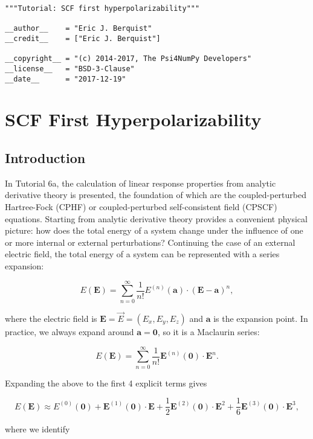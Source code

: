 \documentclass[]{article}
\date{}
\begin{document}
\begin{verbatim}
"""Tutorial: SCF first hyperpolarizability"""

__author__    = "Eric J. Berquist"
__credit__    = ["Eric J. Berquist"]

__copyright__ = "(c) 2014-2017, The Psi4NumPy Developers"
__license__   = "BSD-3-Clause"
__date__      = "2017-12-19"
\end{verbatim}

\hypertarget{scf-first-hyperpolarizability}{%
\section{SCF First
Hyperpolarizability}\label{scf-first-hyperpolarizability}}

\hypertarget{introduction}{%
\subsection{Introduction}\label{introduction}}

In Tutorial 6a, the calculation of linear response properties from
analytic derivative theory is presented, the foundation of which are the
coupled-perturbed Hartree-Fock (CPHF) or coupled-perturbed
self-consistent field (CPSCF) equations. Starting from analytic
derivative theory provides a convenient physical picture: how does the
total energy of a system change under the influence of one or more
internal or external perturbations? Continuing the case of an external
electric field, the total energy of a system can be represented with a
series expansion:

\[
E(\mathbf{E}) = \sum_{n=0}^{\infty} \frac{1}{n!}E^{(n)}(\mathbf{a})\cdot(\mathbf{E}-\mathbf{a})^{n},
\]

where the electric field is \(\mathbf{E} = \vec{E} = (E_x,E_y,E_z)\) and
\(\mathbf{a}\) is the expansion point. In practice, we always expand
around \(\mathbf{a} = \mathbf{0}\), so it is a Maclaurin series:

\[
E(\mathbf{E}) = \sum_{n=0}^{\infty} \frac{1}{n!}\mathbf{E}^{(n)}(\mathbf{0})\cdot\mathbf{E}^{n}.
\]

Expanding the above to the first 4 explicit terms gives

\[
E(\mathbf{E}) \approx E^{(0)}(\mathbf{0}) + \mathbf{E}^{(1)}(\mathbf{0})\cdot\mathbf{E} + \frac{1}{2}\mathbf{E}^{(2)}(\mathbf{0})\cdot\mathbf{E}^{2} + \frac{1}{6}\mathbf{E}^{(3)}(\mathbf{0})\cdot\mathbf{E}^{3},
\]

where we identify
\end{document}
